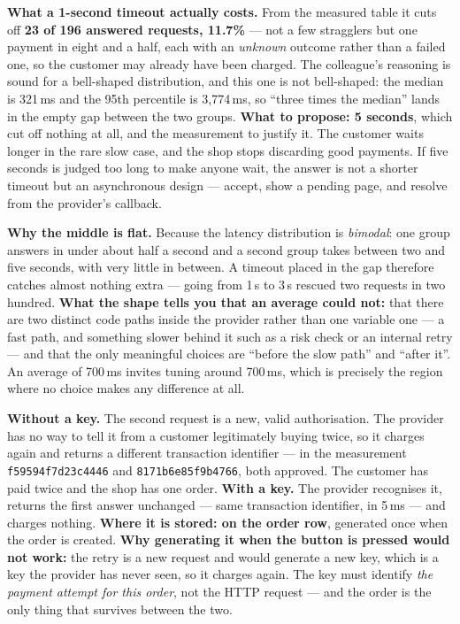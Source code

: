 \begin{ans}
  \item \textbf{What a 1-second timeout actually costs.} From the measured
        table it cuts off \textbf{23 of 196 answered requests, 11.7\%} --- not
        a few stragglers but one payment in eight and a half, each with an
        \emph{unknown} outcome rather than a failed one, so the customer may
        already have been charged. The colleague's reasoning is sound for a
        bell-shaped distribution, and this one is not bell-shaped: the median
        is 321\,ms and the 95th percentile is 3{,}774\,ms, so ``three times the
        median'' lands in the empty gap between the two groups.
        \textbf{What to propose: 5 seconds}, which cut off nothing at all, and
        the measurement to justify it. The customer waits longer in the rare
        slow case, and the shop stops discarding good payments. If five seconds
        is judged too long to make anyone wait, the answer is not a shorter
        timeout but an asynchronous design --- accept, show a pending page, and
        resolve from the provider's callback.
  \item \textbf{Why the middle is flat.} Because the latency distribution is
        \emph{bimodal}: one group answers in under about half a second and a
        second group takes between two and five seconds, with very little in
        between. A timeout placed in the gap therefore catches almost nothing
        extra --- going from 1\,s to 3\,s rescued two requests in two hundred.
        \textbf{What the shape tells you that an average could not:} that there
        are two distinct code paths inside the provider rather than one
        variable one --- a fast path, and something slower behind it such as a
        risk check or an internal retry --- and that the only meaningful
        choices are ``before the slow path'' and ``after it''. An average of
        700\,ms invites tuning around 700\,ms, which is precisely the region
        where no choice makes any difference at all.
  \item \textbf{Without a key.} The second request is a new, valid
        authorisation. The provider has no way to tell it from a customer
        legitimately buying twice, so it charges again and returns a different
        transaction identifier --- in the measurement
        \texttt{f59594f7d23c4446} and \texttt{8171b6e85f9b4766}, both
        approved. The customer has paid twice and the shop has one order.
        \textbf{With a key.} The provider recognises it, returns the first
        answer unchanged --- same transaction identifier, in 5\,ms --- and
        charges nothing. \textbf{Where it is stored: on the order row},
        generated once when the order is created. \textbf{Why generating it
        when the button is pressed would not work:} the retry is a new request
        and would generate a new key, which is a key the provider has never
        seen, so it charges again. The key must identify \emph{the payment
        attempt for this order}, not the HTTP request --- and the order is the
        only thing that survives between the two.
\end{ans}

